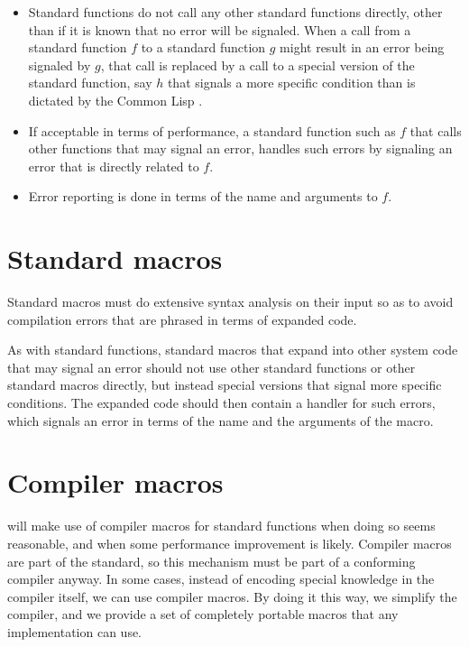 \begin{itemize}
\item Standard functions do not call any other standard functions
  directly, other than if it is known that no error will be signaled.
  When a call from a standard function $f$ to a standard function $g$
  might result in an error being signaled by $g$, that call is
  replaced by a call to a special version of the standard function,
  say $h$ that signals a more specific condition than is dictated by
  the Common Lisp \hs{}.
\item If acceptable in terms of performance, a standard function such
  as $f$ that calls other functions that may signal an error, handles
  such errors by signaling an error that is directly related to $f$.
\item Error reporting is done in terms of the name and arguments to
  $f$.

\end{itemize}

\section{Standard macros}

Standard macros must do extensive syntax analysis on their input so as
to avoid compilation errors that are phrased in terms of expanded
code.

As with standard functions, standard macros that expand into other
system code that may signal an error should not use other standard
functions or other standard macros directly, but instead special
versions that signal more specific conditions.  The expanded code
should then contain a handler for such errors, which signals an error
in terms of the name and the arguments of the macro.

\section{Compiler macros}

{\sysname} will make use of compiler macros for standard functions
when doing so seems reasonable, and when some performance improvement
is likely.  Compiler macros are part of the standard, so this
mechanism must be part of a conforming compiler anyway.  In some
cases, instead of encoding special knowledge in the compiler itself,
we can use compiler macros.  By doing it this way, we simplify the
compiler, and we provide a set of completely portable macros that any
implementation can use.

